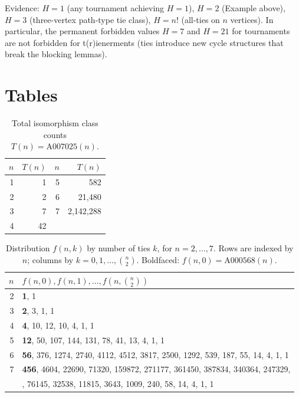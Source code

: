 \documentclass[12pt,reqno]{amsart}
\theoremstyle{definition}
\theoremstyle{plain}
\begin{document}
Evidence: $H=1$ (any tournament achieving $H=1$), $H=2$ (Example above),
$H=3$ (three-vertex path-type tie class), $H=n!$ (all-ties on $n$ vertices).
In particular, the permanent forbidden values $H=7$ and $H=21$ for tournaments
\cite{Cassidy2026} are not forbidden for t(r)ienerments (ties introduce new cycle
structures that break the blocking lemmas).

\section{Tables}
\label{sec:tables}

\begin{table}[ht]
\centering
\caption{Total isomorphism class counts $T(n)=\mathrm{A007025}(n)$.}
\label{tab:T-values}
\begin{tabular}{rr@{\quad}rr}
\toprule
$n$ & $T(n)$ & $n$ & $T(n)$\\
\midrule
1 & 1       & 5 & 582 \\
2 & 2       & 6 & 21{,}480 \\
3 & 7       & 7 & 2{,}142{,}288 \\
4 & 42      &   & \\
\bottomrule
\end{tabular}
\end{table}

\begin{table}[ht]
\centering
\caption{Distribution $f(n,k)$ by number of ties $k$, for $n=2,\ldots,7$.
Rows are indexed by $n$; columns by $k=0,1,\ldots,\binom{n}{2}$.
Boldfaced: $f(n,0)=\mathrm{A000568}(n)$.}
\label{tab:f-distribution}
\small
\begin{tabular}{r@{\quad}l}
\toprule
$n$ & $f(n,0),f(n,1),\ldots,f(n,\binom{n}{2})$ \\
\midrule
2 & \textbf{1}, 1 \\
3 & \textbf{2}, 3, 1, 1 \\
4 & \textbf{4}, 10, 12, 10, 4, 1, 1 \\
5 & \textbf{12}, 50, 107, 144, 131, 78, 41, 13, 4, 1, 1 \\
6 & \textbf{56}, 376, 1274, 2740, 4112, 4512, 3817, 2500, 1292, 539, 187, 55, 14, 4, 1, 1 \\
7 & \textbf{456}, 4604, 22690, 71320, 159872, 271177, 361450, 387834, 340364, 247329, \\
  & \quad 149724, 76145, 32538, 11815, 3643, 1009, 240, 58, 14, 4, 1, 1 \\
\bottomrule
\end{tabular}
\end{table}
\end{document}
